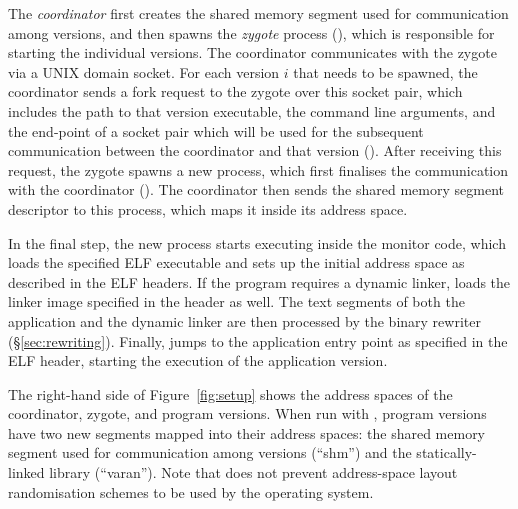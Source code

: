 

The \emph{coordinator} first creates the shared memory segment
used for communication among versions, and then spawns the
\textit{zygote} process (), which is responsible for starting
the individual versions. The coordinator communicates with the zygote
via a UNIX domain socket. For each version $i$ that needs to be spawned,
the coordinator sends a fork request to the zygote over this socket
pair, which includes the path to that version executable, the command
line arguments, and the end-point of a socket pair which will be used
for the subsequent communication between the coordinator and that
version ().
%
After receiving this request, the zygote spawns a new process, which
first finalises the communication with the coordinator
().  The coordinator then sends the shared memory
segment descriptor to this process, which maps it inside its address
space.


In the final step, the new process starts executing inside the monitor
code, which loads the specified ELF executable and sets up the initial
address space as described in the ELF headers. If the program requires
a dynamic linker, \varan loads the linker image specified in the
header as well.
The text segments of both the application and the dynamic linker are
then processed by the binary rewriter (\S\ref{sec:rewriting}). Finally,
\varan jumps to the application entry point as specified in the ELF header,
starting the execution of the application version.

The right-hand side of Figure~\ref{fig:setup} shows the address spaces
of the coordinator, zygote, and program versions.  When run with
\varan, program versions have two new segments mapped into their
address spaces: the shared memory segment used for communication among
versions (``shm'') and the \varan statically-linked library
(``varan'').  Note that \varan does not prevent address-space layout
randomisation schemes to be used by the operating system.

